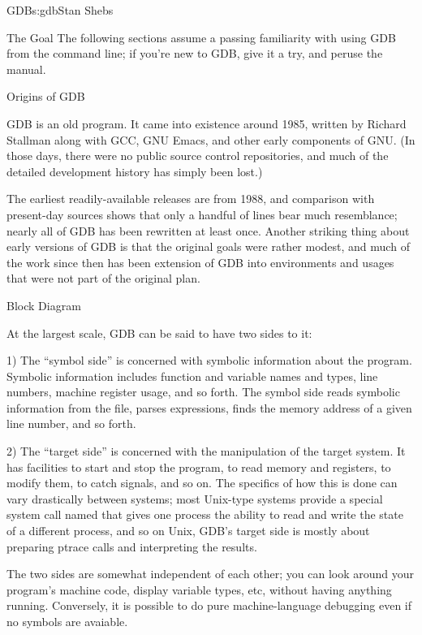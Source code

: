 \begin{aosachapter}{GDB}{s:gdb}{Stan Shebs}
\begin{aosasect1}{The Goal}
The following sections assume a passing familiarity with using GDB
from the command line; if you're new to GDB, give it a try, and peruse
the manual.

\begin{aosasect1}{Origins of GDB}

GDB is an old program.  It came into existence around 1985, written
by Richard Stallman along with GCC, GNU Emacs, and other early
components of GNU.  (In those days, there were no public source
control repositories, and much of the detailed development history
has simply been lost.)

The earliest readily-available releases are from 1988, and comparison
with present-day sources shows that only a handful of lines bear much
resemblance; nearly all of GDB has been rewritten at least once.
Another striking thing about early versions of GDB is that the
original goals were rather modest, and much of the work since then has
been extension of GDB into environments and usages that were not part
of the original plan.

\end{aosasect1}

\begin{aosasect1}{Block Diagram}


At the largest scale, GDB can be said to have two sides to it:

1) The ``symbol side'' is concerned with symbolic information about
the program.  Symbolic information includes function and variable
names and types, line numbers, machine register usage, and so forth.
The symbol side reads symbolic information from the file, parses
expressions, finds the memory address of a given line number, and so
forth.

2) The ``target side'' is concerned with the manipulation of the
target system.  It has facilities to start and stop the program, to
read memory and registers, to modify them, to catch signals, and so
on.  The specifics of how this is done can vary drastically between
systems; most Unix-type systems provide a special system call named
 that gives one process the ability to read and write the
state of a different process, and so on Unix, GDB's target side is
mostly about preparing ptrace calls and interpreting the results.

The two sides are somewhat independent of each other; you can look
around your program's machine code, display variable types, etc,
without having anything running.  Conversely, it is possible to do
pure machine-language debugging even if no symbols are avaiable.


\end{aosasect1}
\end{aosasect1}
\end{aosachapter}
